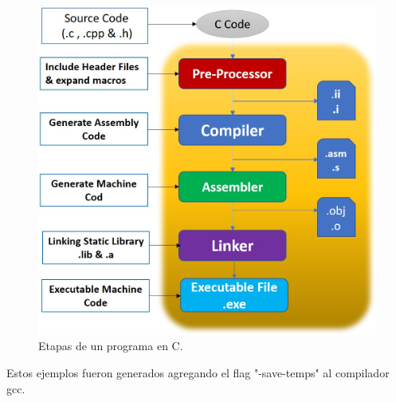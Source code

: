 \documentclass[xcolor=pdftex,table,11pt]{beamer}
\begin{document}
   \begin{frame}
   \begin{figure}

\includegraphics[scale=0.35]{../img/exported/c_step_processes.jpg}
\caption{Etapas de un programa en C.}
\end{figure}
Estos ejemplos fueron generados agregando el flag "-save-temps" al compilador gcc. 


\end{frame}
\end{document}

